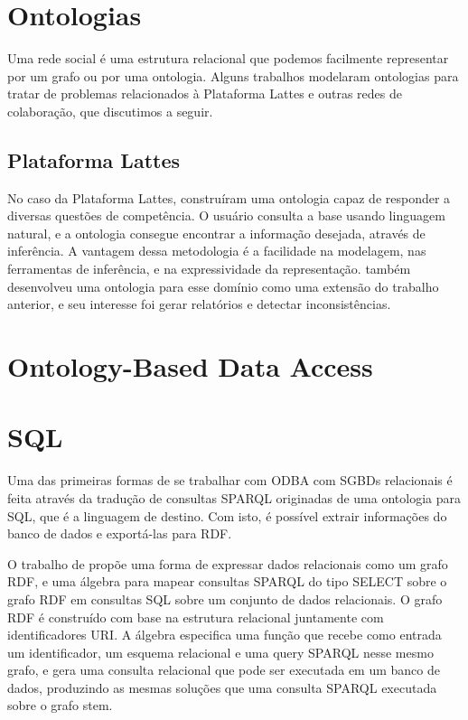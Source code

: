 \section{Ontologias}
\label{sec:ontologias}

Uma rede social é uma estrutura relacional que podemos facilmente representar por um grafo ou por uma ontologia. Alguns trabalhos modelaram ontologias para tratar de problemas relacionados à Plataforma Lattes e outras redes de colaboração, que discutimos a seguir.


\subsection{Plataforma Lattes}
\label{ssec:lattes}

No caso da Plataforma Lattes, \citet{Anaue2009} construíram uma ontologia capaz de responder a diversas questões de competência. O usuário consulta a base usando linguagem natural, e a ontologia consegue encontrar a informação desejada, através de inferência. A vantagem dessa metodologia é a facilidade na modelagem, nas ferramentas de inferência, e na
expressividade da representação. \citet{Galego2013} também desenvolveu uma ontologia para esse domínio como uma extensão do trabalho anterior, e seu interesse foi gerar relatórios e detectar inconsistências.

\section{Ontology-Based Data Access}
\label{sec:obda-papers}


\section{SQL}
\label{sec:sql}

Uma das primeiras formas de se trabalhar com ODBA com SGBDs relacionais
é feita através da tradução de consultas SPARQL originadas de uma ontologia
para SQL, que é a linguagem de destino. Com isto, é possível extrair
informações do banco de dados e exportá-las para RDF.

O trabalho de \citet{Prudhommeaux2008} propõe uma forma de expressar dados
relacionais como um grafo RDF, e uma álgebra para mapear consultas SPARQL
do tipo SELECT sobre o grafo RDF em consultas SQL sobre um conjunto de dados
relacionais. O grafo RDF é construído com base na estrutura relacional
juntamente com identificadores URI. A álgebra especifica uma função que
recebe como entrada um identificador, um esquema relacional e uma query SPARQL
nesse mesmo grafo, e gera uma consulta relacional que pode ser executada
em um banco de dados, produzindo as mesmas soluções que uma consulta SPARQL
executada sobre o grafo stem. %


